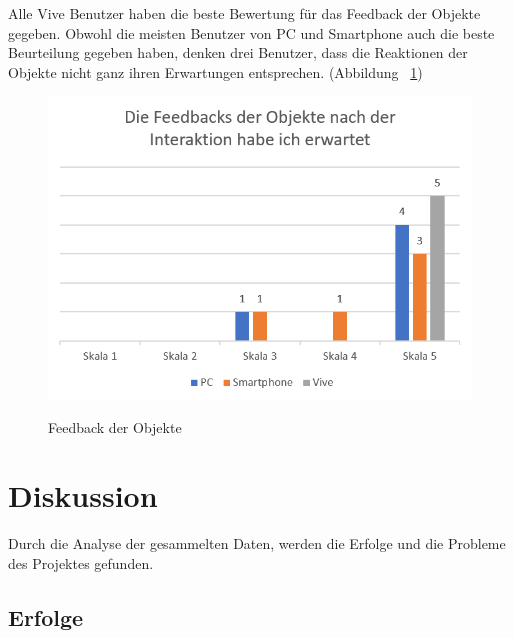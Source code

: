 Alle Vive Benutzer haben die beste Bewertung für das Feedback der Objekte gegeben. Obwohl die meisten Benutzer von PC und Smartphone auch die beste Beurteilung gegeben haben, denken drei Benutzer, dass die Reaktionen der Objekte nicht ganz ihren Erwartungen entsprechen. (Abbildung ~\ref{fig:feedbacksDerObjekte})

\begin{figure}[ht]
\vspace*{1em}
\centering
\caption{Feedback der Objekte}
\includegraphics[width= \textwidth]{images/feedbacksDerObjekte.png}
\label{fig:feedbacksDerObjekte} 
\end{figure}

\section{Diskussion}

Durch die Analyse der gesammelten Daten, werden die Erfolge und die Probleme des Projektes gefunden.

\subsection{Erfolge}

